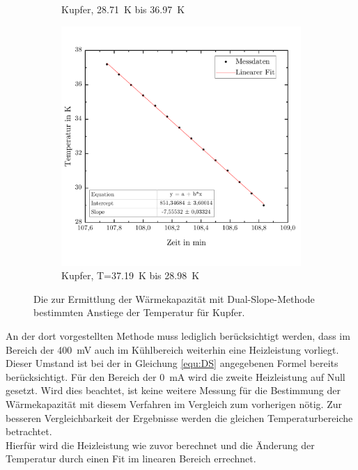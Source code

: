 \documentclass[parskip=half, a4paper,twoside,final]{article}
\begin{document}
\begin{figure}[ht!]
\begin{subfigure}[b!]{0.49\textwidth}
    \vspace{-1cm}
    \caption{Kupfer, \SI{28,71}{\kelvin} bis \SI{36,97}{\kelvin}}
  \end{subfigure}
  \hfill
  \begin{subfigure}[b!]{0.49\textwidth}
    \vspace{-.5cm}
    \includegraphics[width=\textwidth]{Bilder/37_19__28_98__Abfall.pdf}
    \vspace{-1cm}
    \caption{Kupfer, T=\SI{37,19}{\kelvin} bis \SI{28,98}{\kelvin}}
  \end{subfigure}
  \caption{Die zur Ermittlung der Wärmekapazität mit Dual-Slope-Methode bestimmten Anstiege der Temperatur für Kupfer.}
  \label{fig:DS_LineareFits_Kupfer}
\end{figure}

\newpage
An der dort vorgestellten Methode muss lediglich berücksichtigt werden, dass im Bereich der \SI{400}{\milli\volt} auch im Kühlbereich weiterhin eine Heizleistung vorliegt. Dieser Umstand ist bei der in Gleichung \eqref{equ:DS} angegebenen Formel bereits berücksichtigt. Für den Bereich der \SI{0}{\milli\ampere} wird die zweite Heizleistung auf Null gesetzt. Wird dies beachtet, ist keine weitere Messung für die Bestimmung der Wärmekapazität mit diesem Verfahren im Vergleich zum vorherigen nötig. Zur besseren Vergleichbarkeit der Ergebnisse werden die gleichen Temperaturbereiche betrachtet. \\
Hierfür wird die Heizleistung wie zuvor berechnet und die Änderung der Temperatur durch einen Fit im linearen Bereich errechnet.
\end{document}
